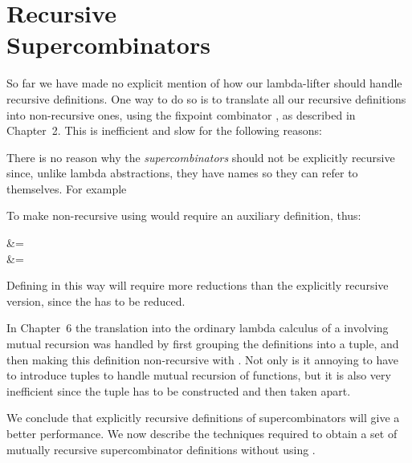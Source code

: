 \chapter[Recursive Supercombinators]{Recursive\\Supercombinators}
\vspace{1cm}

So far we have made no explicit mention of how our lambda-lifter should
handle recursive definitions. One way to do so is to translate all our recursive
definitions into non-recursive ones, using the fixpoint combinator , as
described in Chapter~2. This is inefficient and slow for the following reasons:

\begin{numbered}
    \item There is no reason why the \textit{supercombinators} should not be explicitly
    recursive since, unlike lambda abstractions, they have names so they can
    refer to themselves. For example

    \begin{letalign}
    \end{letalign}

    \item To make  non-recursive using  would require an auxiliary definition,
    thus:

    \begin{letalign}
         &=  \\
         &= 
    \end{letalign}

    Defining  in this way will require more reductions than the explicitly
    recursive version, since the  has to be reduced.

    \item In Chapter~6 the translation into the ordinary lambda calculus of a 
    involving mutual recursion was handled by first grouping the definitions
    into a tuple, and then making this definition non-recursive with . Not
    only is it annoying to have to introduce tuples to handle mutual recursion
    of functions, but it is also very inefficient since the tuple has to be
    constructed and then taken apart.
\end{numbered}
We conclude that explicitly recursive definitions of supercombinators will
give a better performance. We now describe the techniques required to obtain
a set of mutually recursive supercombinator definitions without using .

